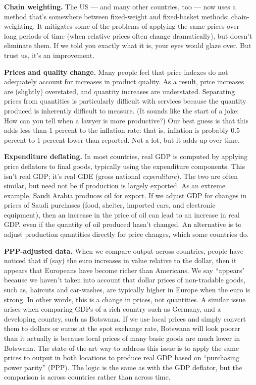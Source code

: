\textbf{Chain weighting.} 
The US --- and many other countries, too ---
now uses a method that's somewhere between fixed-weight and fixed-basket methods:  chain-weighting.
It mitigates some of the problems of applying the same prices over
long periods of time (when relative prices often change dramatically),
but doesn't eliminate them.
If we told you exactly what it is, your eyes would glaze over.
But trust us, it's an improvement.

\textbf{Prices and quality change.} Many people feel that price
indexes do not adequately account for increases in product
quality. As a result, price increases are (slightly) overstated,
and quantity increases are understated.
Separating prices from quantities is particularly
difficult with services because the quantity produced is inherently
difficult to measure. (It sounds like the start of a joke:  How
can you tell when a lawyer is more productive?)  Our best guess is
that this adds less than  1 percent to the inflation rate:  that is,
inflation is probably 0.5 percent to 1 percent lower than reported.
Not a lot, but it adds up over time.

\textbf{Expenditure deflating.}
In most countries, real GDP is computed by
applying price deflators 
 to final goods, typically using the expenditure components.
This isn't real GDP; it's real GDE (gross national {\it expenditure\/}).  The two are often similar, but need not be if production is largely exported.
As an extreme example, Saudi Arabia produces oil for export.
If we adjust GDP for changes in prices of Saudi purchases
(food, shelter, imported cars, and electronic equipment),
then an increase in the price of oil can lead to an increase in real GDP,
even if the quantity of oil produced hasn't changed.
An alternative is to adjust production quantities directly for price changes,
which some countries do.

\textbf{PPP-adjusted data. } When we compare output across countries, people have noticed that
if (say) the euro increases in value relative to the dollar, then
it appears that Europeans have become richer than Americans. We
say ``appears" because we haven't taken into account that dollar
prices of non-tradable goods, such as, haircuts and car-washes, are
typically higher in Europe when the euro is strong. In other
words, this is a change in prices, not quantities. A similar issue
arises when comparing GDPs of a rich country such as Germany, and a
developing country, such as Botswana. If we use local prices and
simply convert them to dollars or euros at the spot exchange rate,
Botswana will look poorer than it actually is because local
prices of many basic goods are much lower in Botswana. The
state-of-the-art way to address this issue is to apply the same
prices to output in both locations to produce real GDP based on ``purchasing power
parity'' (PPP). The logic is the same as with the
GDP deflator, but the comparison is across countries rather
than across time.


